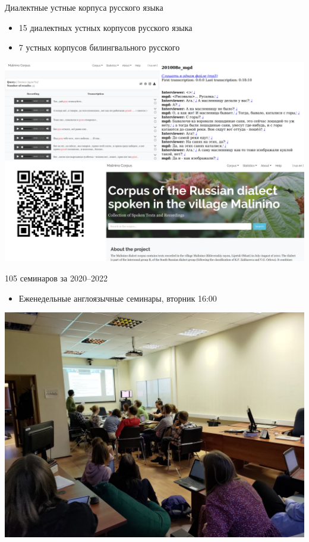 \documentclass[
  13pt,
  ignorenonframetext,
]{beamer}
\providecommand{\tightlist}{%
  \setlength{\itemsep}{0pt}\setlength{\parskip}{0pt}}
\begin{document}
\begin{frame}{Диалектные устные корпуса русского языка}
\protect\hypertarget{ux434ux438ux430ux43bux435ux43aux442ux43dux44bux435-ux443ux441ux442ux43dux44bux435-ux43aux43eux440ux43fux443ux441ux430-ux440ux443ux441ux441ux43aux43eux433ux43e-ux44fux437ux44bux43aux430}{}
\begin{itemize}
\tightlist
\item
  15 диалектных устных корпусов русского языка
\item
  7 устных корпусов билингвального русского
\end{itemize}

\begin{center}\includegraphics[width=1\linewidth]{images/05_corpus} \end{center}
\end{frame}

\begin{frame}{105 семинаров за 2020--2022}
\protect\hypertarget{ux441ux435ux43cux438ux43dux430ux440ux43eux432-ux437ux430-20202022}{}
\begin{itemize}
\tightlist
\item
  Еженедельные англоязычные семинары, вторник 16:00
\end{itemize}

\begin{center}\includegraphics[width=0.9\linewidth]{images/06_seminar} \end{center}
\end{frame}
\end{document}

